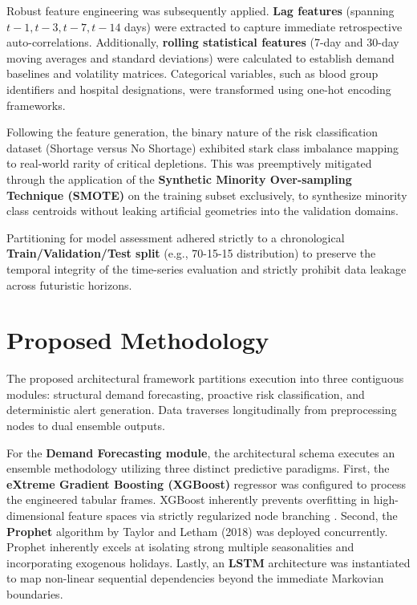 \documentclass[conference]{IEEEtran}
\begin{document}
Robust feature engineering was subsequently applied. \textbf{Lag features} (spanning $t-1, t-3, t-7, t-14$ days) were extracted to capture immediate retrospective auto-correlations. Additionally, \textbf{rolling statistical features} (7-day and 30-day moving averages and standard deviations) were calculated to establish demand baselines and volatility matrices. Categorical variables, such as blood group identifiers and hospital designations, were transformed using one-hot encoding frameworks. 

Following the feature generation, the binary nature of the risk classification dataset (Shortage versus No Shortage) exhibited stark class imbalance mapping to real-world rarity of critical depletions. This was preemptively mitigated through the application of the \textbf{Synthetic Minority Over-sampling Technique (SMOTE)} \cite{b8} on the training subset exclusively, to synthesize minority class centroids without leaking artificial geometries into the validation domains.

Partitioning for model assessment adhered strictly to a chronological \textbf{Train/Validation/Test split} (e.g., 70-15-15 distribution) to preserve the temporal integrity of the time-series evaluation and strictly prohibit data leakage across futuristic horizons.

\section{Proposed Methodology}
The proposed architectural framework partitions execution into three contiguous modules: structural demand forecasting, proactive risk classification, and deterministic alert generation. Data traverses longitudinally from preprocessing nodes to dual ensemble outputs. 

For the \textbf{Demand Forecasting module}, the architectural schema executes an ensemble methodology utilizing three distinct predictive paradigms. First, the \textbf{eXtreme Gradient Boosting (XGBoost)} regressor was configured to process the engineered tabular frames. XGBoost inherently prevents overfitting in high-dimensional feature spaces via strictly regularized node branching \cite{b9}. Second, the \textbf{Prophet} algorithm by Taylor and Letham (2018) \cite{b10} was deployed concurrently. Prophet inherently excels at isolating strong multiple seasonalities and incorporating exogenous holidays. Lastly, an \textbf{LSTM} architecture was instantiated to map non-linear sequential dependencies beyond the immediate Markovian boundaries. 
\end{document}
